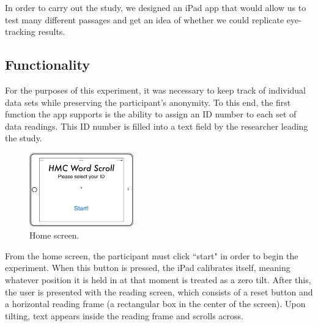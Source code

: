 \documentclass[11pt,letterpaper]{article}
\begin{document}
	In order to carry out the study, we designed an iPad app that would allow us to test many different passages and get an idea of whether we could replicate eye-tracking results.
	
	
	
	\subsection{Functionality}
	
	For the purposes of this experiment, it was necessary to keep track of individual data sets while preserving the participant's anonymity. To this end, the first function the app supports is the ability to assign an ID number to each set of data readings. This ID number is filled into a text field by the researcher leading the study.
	
	\begin{figure}[H]
		\centering
		\includegraphics[width=0.4\textwidth]{splashscreen.png}
		\caption{Home screen.}
	\end{figure}
	
	From the home screen, the participant must click ``start" in order to begin the experiment. When this button is pressed, the iPad calibrates itself, meaning whatever position it is held in at that moment is treated as a zero tilt. After this, the user is presented with the reading screen, which consists of a reset button and a horizontal reading frame (a rectangular box in the center of the screen). Upon tilting, text appears inside the reading frame and scrolls across. 
	
\end{document}
